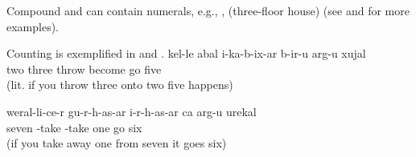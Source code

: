 Compound  and  can contain numerals, e.g.,   ,  (three-floor house)  (see  and  for more examples).

Counting is exemplified in  and .
%
\ea\label{ex:twoplusthreeequalsfive}
\gll	k{\ej}{\lab}el-le	{\eppl}a{\pha}bal	{\paaf}i-ka-b-ix-ar	b-ir{\uvfr}{\lab}-u	arg-u	xujal\\
	two three	throw	become go five\\
\glt	{} (lit. if you throw three onto two five happens)
\z

\ea\label{ex:sevenminusoneequalssix}
\gll	weral-li-c{\lmk}e-r	gu-r-h-as{\lmk}-ar	{\paaf}i-r-h-as{\lmk}-ar	ca	arg-u	urek{\lmk}al\\
	seven	-take	-take	one	go	six\\
\glt	{} (if you take away one from seven it goes six)
\z

